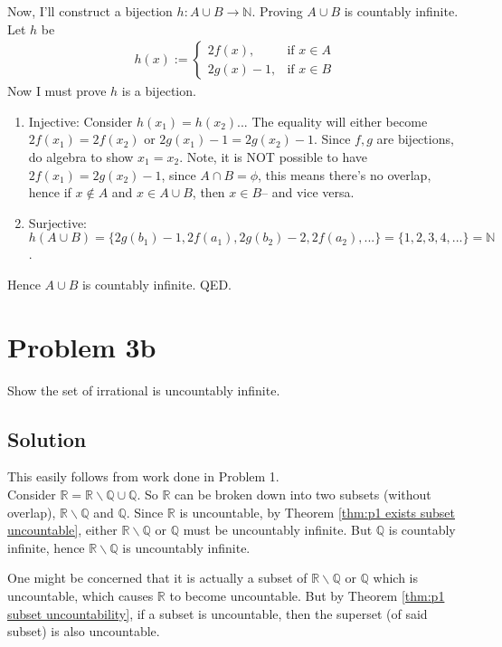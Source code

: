 \documentclass[12pt,fleqn]{article}
\numberwithin{equation}{section} %
\begin{document}
Now, I'll construct a bijection $h: A\cup B \to \mathbb N$. Proving $A\cup B$ is countably infinite. Let $h$ be
\begin{align}
	h(x) := \begin{cases}
		2f(x), &  \text{if } x \in A\\
		2g(x) - 1, & \text{if } x \in B
	\end{cases}
\end{align}
Now I must prove $h$ is a bijection.
\begin{enumerate}
	\item Injective: Consider $h(x_1) = h(x_2)$... The equality will either become $2f(x_1)=  2f(x_2)$ or $2g(x_1) -1 = 2g(x_2) - 1$. Since $f,g$ are bijections, do algebra to show $x_1 = x_2$. Note, it is NOT possible to have $2f(x_1) = 2g(x_2) - 1$, since $A\cap B = \phi$, this means there's no overlap, hence if $x \notin A$ and $x \in A \cup B$, then $x \in B$-- and vice versa.
	\item Surjective:  $h(A \cup B) = \{2g(b_1) - 1, 2f(a_1), 2g(b_2) - 2, 2f(a_2),... \} = \{1,2,3,4,...\}= \mathbb N$. 
\end{enumerate}
Hence $A \cup B$ is countably infinite. QED.

\section*{Problem 3b}
Show the set of irrational is uncountably infinite.
\subsection*{Solution}
This easily follows from work done in Problem 1.
\\

Consider $\mathbb R = \mathbb R \backslash \mathbb Q \cup \mathbb Q$. So $\mathbb R$ can be broken down into two subsets (without overlap), $\mathbb R \backslash \mathbb Q$ and $\mathbb Q$. Since $\mathbb R$ is uncountable, by Theorem \ref{thm:p1 exists subset uncountable}, either $\mathbb R \backslash \mathbb Q$ or $\mathbb Q$ must be uncountably infinite. But $\mathbb Q$ is countably infinite, hence $\mathbb R \backslash \mathbb Q$ is uncountably infinite.
	
	One might be concerned that it is actually a subset of $\mathbb R \backslash \mathbb Q$ or $\mathbb Q$ which is uncountable, which causes $\mathbb R$ to become uncountable. But by Theorem \ref{thm:p1 subset uncountability}, if a subset is uncountable, then the superset (of said subset) is also uncountable. 
	
\end{document}
